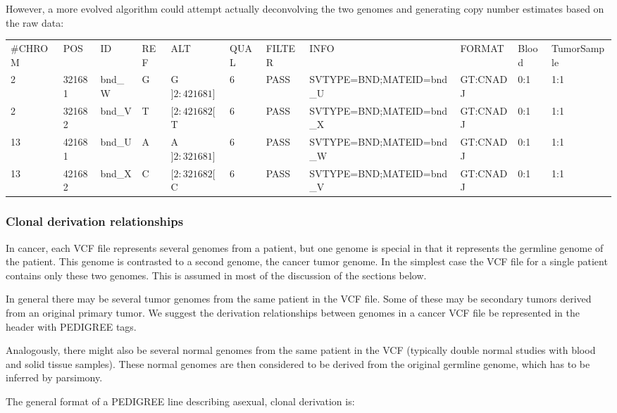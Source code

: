 \documentclass[8pt]{article}
\begin{document}
However, a more evolved algorithm could attempt actually deconvolving the two genomes and generating copy number estimates based on the raw data:

\vspace{0.3cm}
\tiny
\begin{flushleft}
\begin{tabular}{ l l l l l l l l l l l }
\#CHROM & POS & ID & REF & ALT & QUAL & FILTER & INFO & FORMAT & Blood & TumorSample \\
2 & 321681 & bnd\_W & G & G$]2:421681]$ & 6 & PASS & SVTYPE=BND;MATEID=bnd\_U & GT:CNADJ & 0:1 & 1:1 \\
2 & 321682 & bnd\_V & T & $[2:421682[$T & 6 & PASS & SVTYPE=BND;MATEID=bnd\_X & GT:CNADJ & 0:1 & 1:1 \\
13 & 421681 & bnd\_U & A & A$]2:321681]$ & 6 & PASS & SVTYPE=BND;MATEID=bnd\_W & GT:CNADJ & 0:1 & 1:1 \\
13 & 421682 & bnd\_X & C & $[2:321682[$C & 6 & PASS & SVTYPE=BND;MATEID=bnd\_V & GT:CNADJ & 0:1 & 1:1 \\
\end{tabular}
\end{flushleft}
\normalsize

\subsubsection{Clonal derivation relationships}
In cancer, each VCF file represents several genomes from a patient, but one genome is special in that it represents the germline genome of the patient. This genome is contrasted to a second genome, the cancer tumor genome. In the simplest case the VCF file for a single patient contains only these two genomes. This is assumed in most of the discussion of the sections below.

In general there may be several tumor genomes from the same patient in the VCF file. Some of these may be secondary tumors derived from an original primary tumor. We suggest the derivation relationships between genomes in a cancer VCF file be represented in the header with PEDIGREE tags.

Analogously, there might also be several normal genomes from the same patient in the VCF (typically double normal studies with blood and solid tissue samples). These normal genomes are then considered to be derived from the original germline genome, which has to be inferred by parsimony.

The general format of a PEDIGREE line describing asexual, clonal derivation is:
\end{document}
